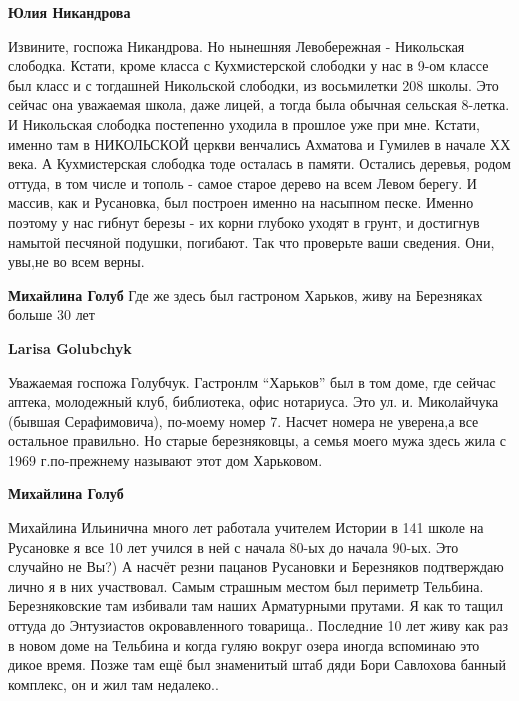 \begin{itemize}
\begin{itemize}
\begin{itemize} %
\textbf{Юлия Никандрова} 

Извините, госпожа Никандрова. Но нынешняя Левобережная - Никольская слободка.
Кстати, кроме класса с Кухмистерской слободки у нас в 9-ом классе был класс и с
тогдашней Никольской слободки, из восьмилетки 208 школы. Это сейчас она
уважаемая школа, даже лицей, а тогда была обычная сельская 8-летка. И
Никольская слободка постепенно уходила в прошлое уже при мне. Кстати, именно
там в НИКОЛЬСКОЙ церкви венчались Ахматова и Гумилев в начале ХХ века. А
Кухмистерская слободка тоде осталась в памяти. Остались деревья, родом оттуда,
в том числе и тополь - самое старое дерево на всем Левом берегу. И массив, как
и Русановка, был построен именно на насыпном песке. Именно поэтому у нас гибнут
березы - их корни глубоко уходят в грунт, и достигнув намытой песчяной
подушки, погибают. Так что проверьте ваши сведения. Они, увы,не во всем верны.

\end{itemize} %

\textbf{Михайлина Голуб} Где же здесь был гастроном Харьков, живу на Березняках больше 30 лет

\begin{itemize} %
\textbf{Larisa Golubchyk} 

Уважаемая госпожа Голубчук. Гастронлм \enquote{Харьков} был в том доме, где сейчас
аптека, молодежный клуб, библиотека, офис нотариуса. Это ул. и. Миколайчука
(бывшая Серафимовича), по-моему номер 7. Насчет номера не уверена,а все
остальное правильно. Но старые березняковцы, а семья моего мужа здесь жила с
1969 г.по-прежнему называют этот дом Харьковом.

\end{itemize} %

\textbf{Михайлина Голуб} 

Михайлина Ильинична много лет работала учителем Истории в 141 школе на
Русановке я все 10 лет учился в ней с начала 80-ых до начала 90-ых. Это
случайно не Вы?) А насчёт резни пацанов Русановки и Березняков подтверждаю
лично я в них участвовал. Самым страшным местом был периметр Тельбина.
Березняковские там избивали там наших Арматурными прутами. Я как то тащил
оттуда до Энтузиастов окровавленного товарища.. Последние 10 лет живу как раз в
новом доме на Тельбина и когда гуляю вокруг озера иногда вспоминаю это дикое
время. Позже там ещё был знаменитый штаб дяди Бори Савлохова банный комплекс,
он и жил там недалеко..


\end{itemize}
\end{itemize}
